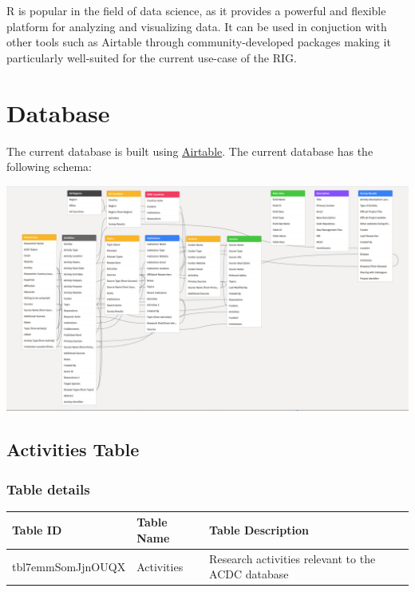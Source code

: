 \documentclass[
]{book}
\begin{document}
R is popular in the field of data science, as it provides a powerful and flexible platform for analyzing and visualizing data. It can be used in conjuction with other tools such as Airtable through community-developed packages making it particularly well-suited for the current use-case of the RIG.

\hypertarget{database}{%
\chapter{Database}\label{database}}

The current database is built using \href{https://airtable.com}{Airtable}. The current database has the following schema:

\includegraphics{images/database_schema.png}

\hypertarget{activities-table}{%
\section{Activities Table}\label{activities-table}}

\hypertarget{table-details}{%
\subsection{Table details}\label{table-details}}

\begin{table}
\centering
\begin{tabular}{l|l|l}
\hline
\textbf{Table ID} & \textbf{Table Name} & \textbf{Table Description}\\
\hline
tbl7emmSomJjnOUQX & Activities & Research activities relevant to the ACDC database\\
\hline
\end{tabular}
\end{table}
\end{document}

